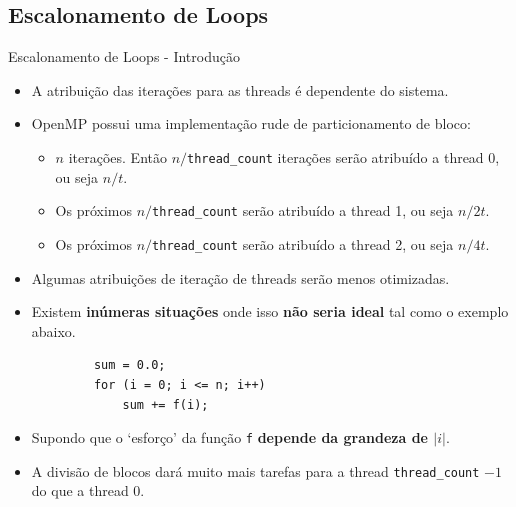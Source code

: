 	\subsection{Escalonamento de Loops}
	\begin{frame}[fragile]{Escalonamento de Loops - Introdução}
		\begin{itemize}
			\setlength\itemsep{0.3em}
			\item A atribuição das iterações para as threads é dependente do sistema.
			\item OpenMP possui uma implementação rude de particionamento de bloco:
			\begin{itemize}
				\item $n$ iterações. Então $n/${\tt thread\_count} iterações serão atribuído a thread 0, ou seja $n/t$.
				\item Os próximos $n/${\tt thread\_count} serão atribuído a thread 1, ou seja $n/2t$.
				\item Os próximos $n/${\tt thread\_count} serão atribuído a thread 2, ou seja $n/4t$.
			\end{itemize}
			\item Algumas atribuições de iteração de threads serão menos otimizadas.
			\item Existem \textbf{inúmeras situações} onde isso \textbf{não seria ideal} tal como o exemplo abaixo.
		\end{itemize}
		\begin{verbatim}
			sum = 0.0;
			for (i = 0; i <= n; i++) 
				sum += f(i);
		\end{verbatim}
		\begin{itemize}
			\setlength\itemsep{0.2em}
			\item Supondo que o `esforço' da função {\tt f} \textbf{depende da grandeza de $|i|$}.
			\item A divisão de blocos dará muito mais tarefas para a thread {\tt thread\_count} $-1$ do que a thread 0.
		\end{itemize}
\end{frame}

